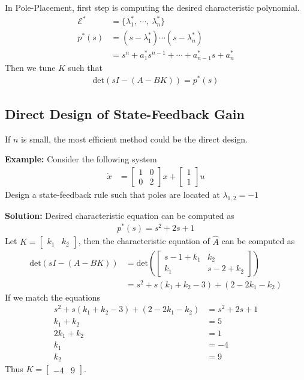 \documentclass[twoside]{article}
\begin{document}
In Pole-Placement, first step is computing the desired 
characteristic polynomial. 
%
\begin{align*}
 \mathcal{E}^* &= \lbrace \lambda_1^* , \ \cdots, \  \lambda_n^*
                 \rbrace
  \\
  p^*(s) &= \left( s - \lambda_1^* \right) \cdots \left( s - \lambda_n^*
         \right)                         
  \\
  &= s^n + a_1^* s^{n-1} + \cdots + a_{n-1}^* s + a_n^*
\end{align*}
%
Then we tune $K$ such that 
\begin{align*}
  \mathrm{det} \left( s I - ( A - B K ) \right) = p^*(s)
\end{align*}

\subsection{Direct Design of State-Feedback Gain}

If $n$ is small, the most efficient method could be the direct
design. 

\textbf{Example:} Consider the following system
%
\begin{align*}
 \dot{x} &= \left[ \begin{array}{cc} 1 & 0 \\ 0 & 2 \end{array} \right] x
    + \left[ \begin{array}{c} 1 \\ 1 \end{array} \right] u
\end{align*}
% 
Design a state-feedback rule such that poles are located at 
$\lambda_{1,2} = -1$ 

\textbf{Solution:} Desired characteristic equation can be computed as
%
\begin{align*}
  p^*(s) = s^2 + 2 s + 1
\end{align*}
%
Let $K = \left[ \begin{array}{cc} k_1 & k_2 \end{array} \right]$, then
the characteristic equation of $\hat{A}$ can be computed as
%
\begin{align*}
  \mathrm{det} \left( s I - ( A - B K ) \right) &= 
  \mathrm{det} \left(
  \left[ \begin{array}{cc} s - 1 + k_1 & k_2 \\ k_1 & s - 2 + k_2 \end{array} \right]
  \right)
\\
&= s^2 + s (k_1 + k_2 - 3) + (2 -2 k_1 - k_2)
\end{align*}
%
If we match the equations
%
\begin{align*}
s^2 + s (k_1 + k_2 - 3) + (2 -2 k_1 - k_2) &= s^2 + 2 s + 1
\\
k_1 + k_2 &= 5
\\
2k_1 + k_2 &= 1
\\
k_1 &= -4
\\
k_2 &= 9
\end{align*}
%
Thus $K = \left[ \begin{array}{cc} -4 & 9 \end{array} \right]$.
\end{document}
